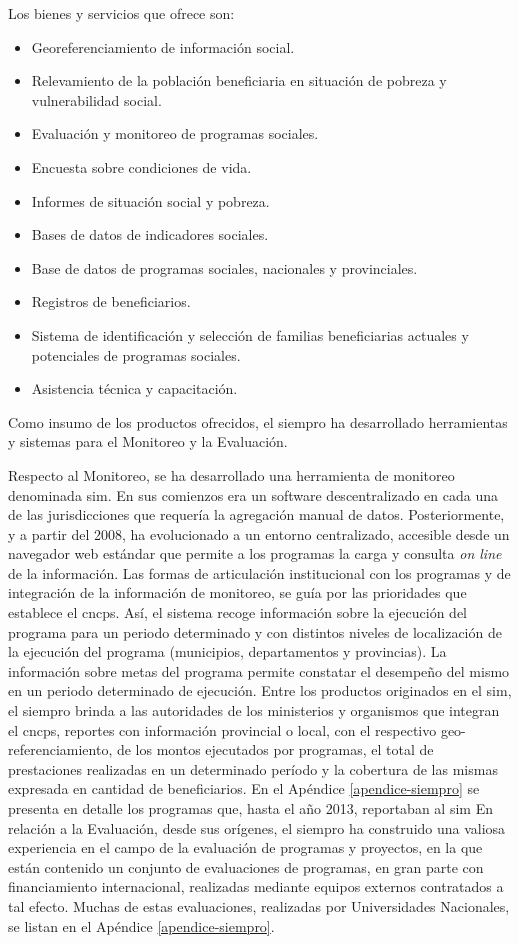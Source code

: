 Los bienes y servicios que ofrece son:
    \begin{itemize}
        \item Georeferenciamiento de información social.
        \item Relevamiento de la población beneficiaria en situación de pobreza y vulnerabilidad social.
        \item Evaluación y monitoreo de programas sociales.
        \item Encuesta sobre condiciones de vida.
        \item Informes de situación social y pobreza.
        \item Bases de datos de indicadores sociales.
        \item Base de datos de programas sociales, nacionales y provinciales.
        \item Registros de beneficiarios.
        \item Sistema de identificación y selección de familias beneficiarias actuales y potenciales de programas sociales.
        \item Asistencia técnica y capacitación.
    \end{itemize}
    
Como insumo de los productos ofrecidos, el \ac{siempro} ha desarrollado herramientas y sistemas para el Monitoreo y la Evaluación. 

Respecto al Monitoreo, se ha desarrollado una herramienta de monitoreo denominada \ac{sim}. En sus comienzos era un software descentralizado en cada una de las jurisdicciones que requería la agregación manual de datos. Posteriormente, y a partir del 2008, ha evolucionado a un entorno centralizado, accesible desde un navegador web estándar que permite a los programas la carga y consulta \emph{on line} de la información. Las formas de articulación institucional con los programas y de integración de la información de monitoreo, se guía por las prioridades que establece el \ac{cncps}. Así, el sistema recoge información sobre la ejecución del programa para un periodo determinado y con distintos niveles de localización de la ejecución del programa (municipios, departamentos y provincias). La información sobre metas del programa permite constatar el desempeño del mismo en un periodo determinado de ejecución. Entre los productos originados en el \ac{sim}, el \ac{siempro} brinda a las autoridades de los ministerios y organismos que integran el \ac{cncps}, reportes con información provincial o local, con el respectivo geo-referenciamiento, de los montos ejecutados por programas, el total de prestaciones realizadas en un determinado período y la cobertura de las mismas expresada en cantidad de beneficiarios. En el Apéndice \ref{apendice-siempro} se presenta en detalle los programas que, hasta el año 2013, reportaban al \ac{sim}
En relación a la Evaluación, desde sus orígenes, el \ac{siempro} ha construido una valiosa experiencia en el campo de la evaluación de programas y proyectos, en la que están contenido un conjunto de evaluaciones de programas, en  gran parte con financiamiento internacional, realizadas mediante equipos externos contratados a tal efecto. Muchas de estas evaluaciones, realizadas por Universidades Nacionales, se listan en el Apéndice \ref{apendice-siempro}. 

